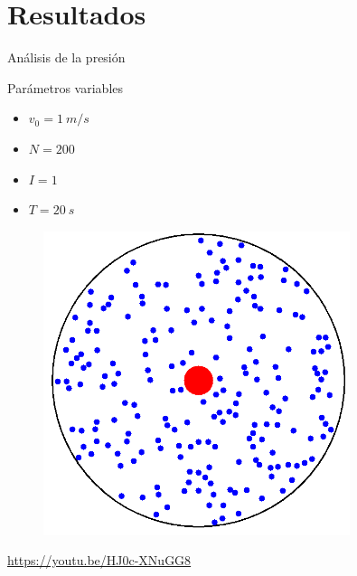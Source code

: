 \section{Resultados}\label{sec:resultados}

\begin{frame}{Análisis de la presión}
    \begin{minipage}{0.45\textwidth}
        \begin{block}{Parámetros variables}
            \begin{itemize}
                \item $v_0 = 1\ m/s$
                \item $N = 200$
                \item $I = 1$
                \item $T = 20\ s$
            \end{itemize}
        \end{block}
    \end{minipage}
    \hfill
    \begin{minipage}{0.45\textwidth}
        \begin{figure}[H]
            \centering
            \includegraphics[width=0.8\textwidth]{pic/1.1/animation_1}
            \label{fig:av1}
        \end{figure}
        \tiny{\href{https://youtu.be/HJ0c-XNuGG8}{https://youtu.be/HJ0c-XNuGG8}}
    \end{minipage}
\end{frame}


